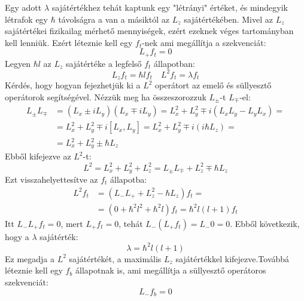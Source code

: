 \documentclass[../main.tex]{subfiles}
\begin{document}
Egy adott $\lambda$ sajátértékhez tehát kaptunk egy "létrányi" értéket, és mindegyik létrafok egy $\hbar$ távolságra a van a másiktól az $L_z$ sajátértékében. Mivel az $L_z$ sajátértékei fizikailag mérhető mennyiségek, ezért ezeknek véges tartományban kell lenniük.
Ezért léteznie kell egy $f_t$-nek ami megállítja a szekvenciát:
\begin{equation}
    L_+ f_t = 0
\end{equation}
Legyen $\hbar l$ az $L_z$ sajátértéke a legfelső $f_t$ állapotban:
\begin{equation}
    L_z f_t = \hbar l f_t \quad L^2 f_t = \lambda f_t
\end{equation}
Kérdés, hogy hogyan fejezhetjük ki a $L^2$ operátort az emelő és süllyesztő operátorok segítségével. Nézzük meg ha összeszorozzuk $L_\pm$-t $L_\mp$-el:
\begin{equation}
    \begin{aligned}
        L_\pm L_\mp &= (L_x \pm i L_y)(L_x \mp i L_y) = L_x^2 + L_y^2 \mp i (L_x L_y - L_y L_x) = \\
        &= L_x^2 + L_y^2 \mp i [L_x, L_y] = L_x^2 + L_y^2 \mp i(i\hbar L_z) = \\
        &= L_x^2 + L_y^2 \pm \hbar L_z
    \end{aligned}
\end{equation}
Ebből kifejezve az $L^2$-t:
\begin{equation}
    L^2 = L_x^2 + L_y^2 + L_z^2 = L_\pm L_\mp + L_z^2 \mp \hbar L_z
\end{equation}
Ezt visszahelyettesítve az $f_t$ állapotba:
\begin{equation}
    \begin{aligned}
       L^2 f_t &= (L_- L_+ + L_z^2 - \hbar L_z) f_t = \\
       &= \left(0 + \hbar^2 l^2 + \hbar^2 l\right)f_t = \hbar^2 l (l + 1) f_t
    \end{aligned}
\end{equation}
Itt $L_-L_+ f_t = 0$, mert $L_+ f_t = 0$, tehát $L_- (L_+ f_t) = L_- 0 = 0$. Ebből következik, hogy a $\lambda$ sajátérték:
\begin{equation}
    \lambda = \hbar^2 l (l + 1)
\end{equation}
Ez megadja a $L^2$ sajátértékét, a maximális $L_z$ sajátértékkel kifejezve.Továbbá léteznie kell egy $f_b$ állapotnak is, ami megállítja a süllyesztő operátoros szekvenciát:
\begin{equation}
    L_- f_b = 0
\end{equation}
\end{document}
